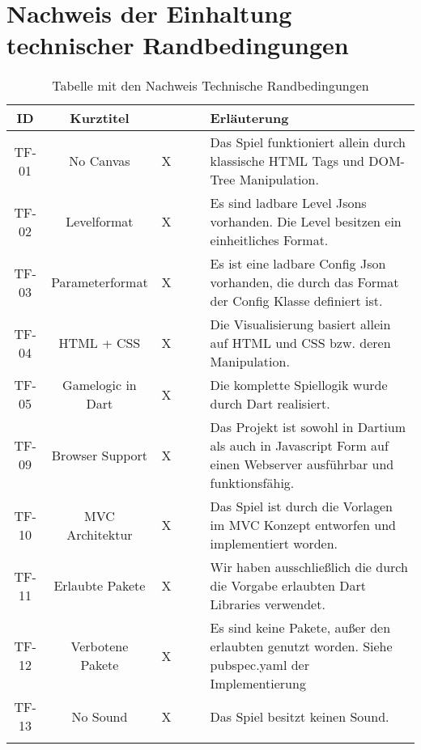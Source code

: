 \documentclass[a4paper,10pt]{report}
\begin{document}
    \section{Nachweis der Einhaltung technischer Randbedingungen}
    {
        \begin{longtable}{|c|c|c|c|c|p{}|}
    	\hline
    	\textbf{ID} 								&
    	\textbf{Kurztitel}							&
    	{\rotatebox{90}{\textbf{Erfüllt 		}}} &
    	{\rotatebox{90}{\textbf{Teilw. erfüllt 	}}} &
    	{\rotatebox{90}{\textbf{Nicht erfüllt 	}}} &
		\textbf{Erläuterung} \\
    	\hline
    	TF-01 	& 	No Canvas					& 	X	& 		& 		& Das Spiel funktioniert allein durch klassische HTML Tags und DOM-Tree Manipulation. \\
    	\hline
    	TF-02 	& 	Levelformat					& 	X	& 		& 		& Es sind ladbare Level Jsons vorhanden. Die Level besitzen ein einheitliches Format. \\
    	\hline
    	TF-03 	& 	Parameterformat				& 	X	& 		& 		& Es ist eine ladbare Config Json vorhanden, die durch das Format der Config Klasse definiert ist. \\
    	\hline
    	TF-04 	& 	HTML + CSS					& 	X	& 		& 		& Die Visualisierung basiert allein auf HTML und CSS bzw. deren Manipulation. \\
    	\hline
    	TF-05 	& 	Gamelogic in Dart			& 	X	& 		& 		& Die komplette Spiellogik wurde durch Dart realisiert. \\
    	\hline
    	TF-09 	& 	Browser Support				& 	X	& 		& 		& Das Projekt ist sowohl in Dartium als auch in Javascript Form auf einen Webserver ausführbar und funktionsfähig. \\
    	\hline
    	TF-10 	& 	MVC Architektur				& 	X	& 		& 		& Das Spiel ist durch die Vorlagen im MVC Konzept entworfen und implementiert worden. \\
    	\hline
    	TF-11 	& 	Erlaubte Pakete				& 	X	& 		& 		& Wir haben ausschließlich die durch die Vorgabe erlaubten Dart Libraries verwendet. \\
    	\hline
    	TF-12 	& 	Verbotene Pakete			& 	X	& 		& 		& Es sind keine Pakete, außer den erlaubten genutzt worden. Siehe pubspec.yaml der Implementierung \\
    	\hline
    	TF-13 	& 	No Sound					& 	X	& 		& 		& Das Spiel besitzt keinen Sound. \\
    	\hline
    	\caption{Tabelle mit den Nachweis Technische Randbedingungen}   	
    	\end{longtable}
    }
\end{document}

